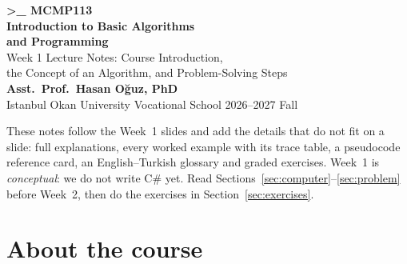 \documentclass[11pt,a4paper]{article}
\newif\ifsolutions
\begin{document}
\begin{tcolorbox}[enhanced,colback=ink,colframe=ink,arc=3mm,boxrule=0pt,left=6mm,right=6mm,top=5mm,bottom=5mm]
\begin{minipage}[c]{0.74\linewidth}
{\ttfamily\bfseries\color{amber}>\_ MCMP113}\\[2mm]
{\sffamily\bfseries\LARGE\color{white}Introduction to Basic Algorithms\\[1mm] and Programming}\\[3mm]
{\sffamily\large\color{white!80!ink}Week 1 Lecture Notes: Course Introduction,\\ the Concept of an Algorithm, and Problem-Solving Steps}\\[4mm]
{\sffamily\small\color{white}\textbf{Asst.\ Prof.\ Hasan Oğuz, PhD}\\
\color{white!75!ink}Istanbul Okan University \textperiodcentered{} Vocational School \textperiodcentered{} 2026--2027 Fall}
\ifsolutions\\[2mm]{\sffamily\small\bfseries\color{amber}INSTRUCTOR EDITION -- contains solutions}\fi
\end{minipage}\hfill
\begin{minipage}[c]{0.22\linewidth}\centering
\end{minipage}
\end{tcolorbox}

\vspace{2mm}
\begin{notebox}
These notes follow the Week~1 slides and add the details that do not fit on a slide: full explanations, every worked example with its trace table, a pseudocode reference card, an English--Turkish glossary and graded exercises. Week~1 is \emph{conceptual}: we do not write C\# yet. Read Sections~\ref{sec:computer}--\ref{sec:problem} before Week~2, then do the exercises in Section~\ref{sec:exercises}.
\end{notebox}

{\small\tableofcontents}

\section{About the course}\label{sec:course}
\end{document}
